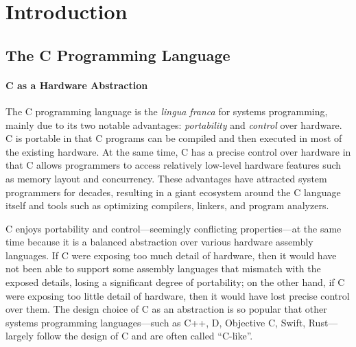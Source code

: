 \section{Introduction}
\label{sec:introduction}

\subsection{The C Programming Language}

\paragraph{C as a Hardware Abstraction}

The C programming language is the \emph{lingua franca} for systems programming, mainly due to its
two notable advantages: \emph{portability} and \emph{control} over hardware.  C is portable in that
C programs can be compiled and then executed in most of the existing hardware.  At the same time, C
has a precise control over hardware in that C allows programmers to access relatively low-level
hardware features such as memory layout and concurrency.  These advantages have attracted system
programmers for decades, resulting in a giant ecosystem around the C language itself and tools such
as optimizing compilers, linkers, and program analyzers.

C enjoys portability and control---seemingly conflicting properties---at the same time because it is
a balanced abstraction over various hardware assembly languages.  If C were exposing too much detail
of hardware, then it would have not been able to support some assembly languages that mismatch with
the exposed details, losing a significant degree of portability; on the other hand, if C were
exposing too little detail of hardware, then it would have lost precise control over them.  The
design choice of C as an abstraction is so popular that other systems programming languages---such
as C++, D, Objective C, Swift, Rust---largely follow the design of C and are often called
``C-like''.




